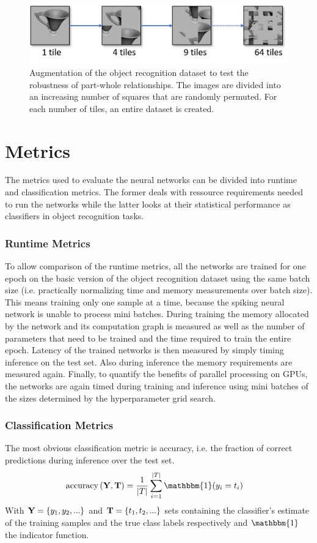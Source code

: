 \begin{figure}[H]
    \centering
    \includegraphics[width=\textwidth]{figures/picasso.png}
\caption[Augmentation of the object recognition dataset to test the robustness of part-whole relationships]{Augmentation of the object recognition dataset to test the robustness of part-whole relationships. The images are divided into an increasing number of squares that are randomly permuted. For each number of tiles, an entire dataset is created.}\label{fig:picasso}
\end{figure}\noindent
\section{Metrics}
The metrics used to evaluate the neural networks can be divided into runtime and classification metrics. The former deals with ressource requirements needed to run the networks while the latter looks at their statistical performance as classifiers in object recognition tasks.
\subsubsection{Runtime Metrics}
To allow comparison of the runtime metrics, all the networks are trained for one epoch on the basic version of the object recognition dataset using the same batch size (i.e. practically normalizing time and memory measurements over batch size). This means training only one sample at a time, because the spiking neural network is unable to process mini batches. During training the memory allocated by the network and its computation graph is measured as well as the number of parameters that need to be trained and the time required to train the entire epoch. Latency of the trained networks is then measured by simply timing inference on the test set. Also during inference the memory requirements are measured again. Finally, to quantify the benefits of parallel processing on GPUs, the networks are again timed during training and inference using mini batches of the sizes determined by the hyperparameter grid search.
\subsubsection{Classification Metrics}
The most obvious classification metric is accuracy, i.e. the fraction of correct predictions during inference over the test set.
\begin{align}
    \operatorname{accuracy}\qty(\vb{Y}, \vb{T}) &= \frac{1}{\abs{T}}\sum_{i=1}^{\abs{T}} \mathbbm{1}\qty(y_i=t_i)
\end{align}
With $\vb{Y}=\qty{y_1,y_2,...}$ and $\vb{T}=\qty{t_1,t_2,...}$ sets containing the classifier's estimate of the training samples and the true class labels respectively and $\mathbbm{1}$ the indicator function.